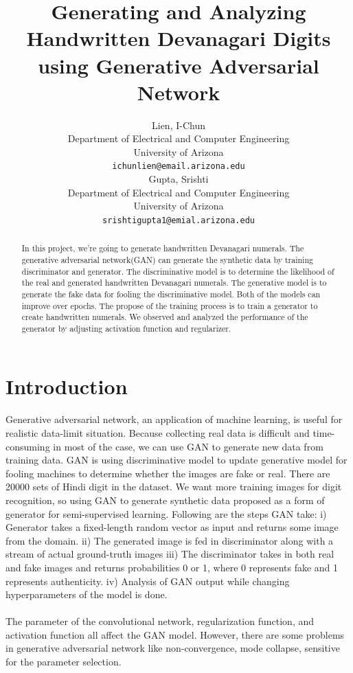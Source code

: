 \documentclass{article}
\title{Generating and Analyzing Handwritten Devanagari Digits using Generative Adversarial Network}
\author{%
  Lien, I-Chun \\
  Department of Electrical and Computer Engineering\\
  University of Arizona\\
  \texttt{ichunlien@email.arizona.edu} 
  \\[3ex]
  Gupta,  Srishti  \\
  Department of Electrical and Computer Engineering\\
  University of Arizona\\
  \texttt{srishtigupta1@emial.arizona.edu} 
%
}
\begin{document}

\maketitle

\begin{abstract}
  In this project, we’re going to generate handwritten Devanagari numerals. The generative adversarial network(GAN) can generate the synthetic data by training discriminator and generator. The discriminative model is to determine the likelihood of the real and generated handwritten Devanagari numerals. The generative model is to generate the fake data for fooling the discriminative model. Both of the models can improve over epochs. The propose of the training process is to train a generator to create handwritten numerals. We observed and analyzed the performance of the generator by adjusting activation function and regularizer.
\end{abstract}

\section{Introduction}

\paragraph{}
Generative adversarial network, an application of machine learning, is useful for realistic data-limit situation. Because collecting real data is difficult and time-consuming in most of the case, we can use GAN to generate new data from training data. GAN is using discriminative model to update generative model for fooling machines to determine whether the images are fake or real. There are 20000 sets of  Hindi digit in the dataset. We want more training images for digit recognition, so using GAN to generate synthetic data proposed as a form of generator for semi-supervised learning. 
Following are the steps GAN take:
i)	Generator takes a fixed-length random vector as input and returns some image from the domain.
ii)	The generated image is fed in discriminator along with a stream of actual ground-truth images 
iii)	The discriminator takes in both real and fake images and returns probabilities 0 or 1, where 0 represents fake and 1 represents authenticity.
iv)	Analysis of GAN output while changing hyperparameters of the model is done.
\paragraph{}
The parameter of the convolutional network, regularization function, and activation function all affect the GAN model. However, there are some problems in generative adversarial network like non-convergence, mode collapse, sensitive for the parameter selection. 
\end{document}
